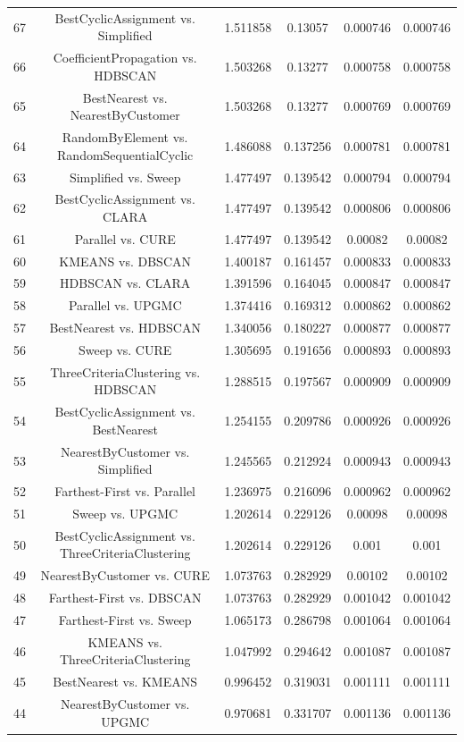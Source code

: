 \documentclass[a4paper,10pt]{article}
\begin{document}
\begin{landscape}
\begin{table}[!htp]
\begin{tabular}{cccccc}
67&BestCyclicAssignment vs. Simplified&1.511858&0.13057&0.000746&0.000746\\
66&CoefficientPropagation vs. HDBSCAN&1.503268&0.13277&0.000758&0.000758\\
65&BestNearest vs. NearestByCustomer&1.503268&0.13277&0.000769&0.000769\\
64&RandomByElement vs. RandomSequentialCyclic&1.486088&0.137256&0.000781&0.000781\\
63&Simplified vs. Sweep&1.477497&0.139542&0.000794&0.000794\\
62&BestCyclicAssignment vs. CLARA&1.477497&0.139542&0.000806&0.000806\\
61&Parallel vs. CURE&1.477497&0.139542&0.00082&0.00082\\
60&KMEANS vs. DBSCAN&1.400187&0.161457&0.000833&0.000833\\
59&HDBSCAN vs. CLARA&1.391596&0.164045&0.000847&0.000847\\
58&Parallel vs. UPGMC&1.374416&0.169312&0.000862&0.000862\\
57&BestNearest vs. HDBSCAN&1.340056&0.180227&0.000877&0.000877\\
56&Sweep vs. CURE&1.305695&0.191656&0.000893&0.000893\\
55&ThreeCriteriaClustering vs. HDBSCAN&1.288515&0.197567&0.000909&0.000909\\
54&BestCyclicAssignment vs. BestNearest&1.254155&0.209786&0.000926&0.000926\\
53&NearestByCustomer vs. Simplified&1.245565&0.212924&0.000943&0.000943\\
52&Farthest-First vs. Parallel&1.236975&0.216096&0.000962&0.000962\\
51&Sweep vs. UPGMC&1.202614&0.229126&0.00098&0.00098\\
50&BestCyclicAssignment vs. ThreeCriteriaClustering&1.202614&0.229126&0.001&0.001\\
49&NearestByCustomer vs. CURE&1.073763&0.282929&0.00102&0.00102\\
48&Farthest-First vs. DBSCAN&1.073763&0.282929&0.001042&0.001042\\
47&Farthest-First vs. Sweep&1.065173&0.286798&0.001064&0.001064\\
46&KMEANS vs. ThreeCriteriaClustering&1.047992&0.294642&0.001087&0.001087\\
45&BestNearest vs. KMEANS&0.996452&0.319031&0.001111&0.001111\\
44&NearestByCustomer vs. UPGMC&0.970681&0.331707&0.001136&0.001136\\

\end{tabular}
\end{table}
\end{landscape}
\end{document}

